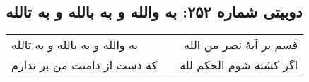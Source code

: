 \begin{center}
\section*{دوبیتی شماره ۲۵۲: به والله و به بالله و به تالله}
\label{sec:252}
\begin{longtable}{l p{0.5cm} r}
به والله و به بالله و به تالله
&&
قسم بر آیهٔ نصر من الله
\\
که دست از دامنت من بر ندارم
&&
اگر کشته شوم الحکم لله
\\
\end{longtable}
\end{center}
